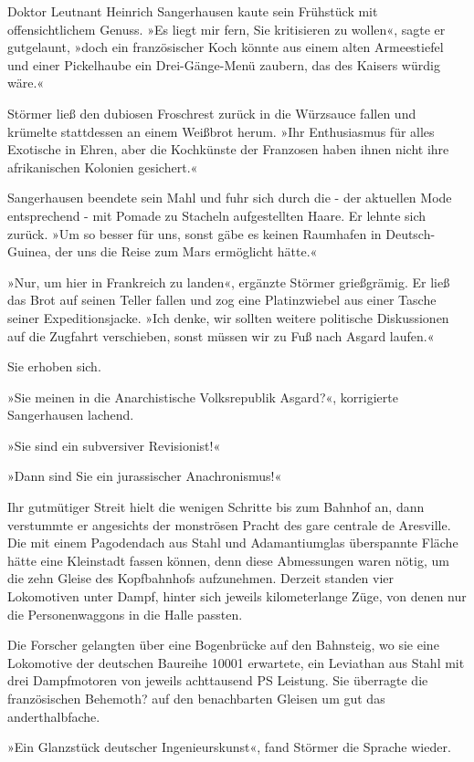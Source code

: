 Doktor Leutnant Heinrich Sangerhausen kaute sein Frühstück mit
offensichtlichem Genuss. »Es liegt mir fern, Sie kritisieren zu
wollen«, sagte er gutgelaunt, »doch ein französischer Koch könnte
aus einem alten Armeestiefel und einer Pickelhaube ein
Drei-Gänge-Menü zaubern, das des Kaisers würdig wäre.«

Störmer ließ den dubiosen Froschrest zurück in die Würzsauce fallen
und krümelte stattdessen an einem Weißbrot herum. »Ihr Enthusiasmus
für alles Exotische in Ehren, aber die Kochkünste der Franzosen
haben ihnen nicht ihre afrikanischen Kolonien gesichert.«

Sangerhausen beendete sein Mahl und fuhr sich durch die - der
aktuellen Mode entsprechend - mit Pomade zu Stacheln aufgestellten
Haare. Er lehnte sich zurück. »Um so besser für uns, sonst gäbe es
keinen Raumhafen in Deutsch-Guinea, der uns die Reise zum Mars
ermöglicht hätte.«

»Nur, um hier in Frankreich zu landen«, ergänzte Störmer
grießgrämig. Er ließ das Brot auf seinen Teller fallen und zog eine
Platinzwiebel aus einer Tasche seiner Expeditionsjacke. »Ich denke,
wir sollten weitere politische Diskussionen auf die Zugfahrt
verschieben, sonst müssen wir zu Fuß nach Asgard laufen.«

Sie erhoben sich.

»Sie meinen in die Anarchistische Volksrepublik Asgard?«,
korrigierte Sangerhausen lachend.

»Sie sind ein subversiver Revisionist!«

»Dann sind Sie ein jurassischer Anachronismus!«

Ihr gutmütiger Streit hielt die wenigen Schritte bis zum Bahnhof
an, dann verstummte er angesichts der monströsen Pracht des gare
centrale de Aresville. Die mit einem Pagodendach aus Stahl und
Adamantiumglas überspannte Fläche hätte eine Kleinstadt fassen
können, denn diese Abmessungen waren nötig, um die zehn Gleise des
Kopfbahnhofs aufzunehmen. Derzeit standen vier Lokomotiven unter
Dampf, hinter sich jeweils kilometerlange Züge, von denen nur die
Personenwaggons in die Halle passten.

Die Forscher gelangten über eine Bogenbrücke auf den Bahnsteig, wo
sie eine Lokomotive der deutschen Baureihe 10001 erwartete, ein
Leviathan aus Stahl mit drei Dampfmotoren von jeweils achttausend
PS Leistung. Sie überragte die französischen Behemoth? auf den
benachbarten Gleisen um gut das anderthalbfache.

»Ein Glanzstück deutscher Ingenieurskunst«, fand Störmer die
Sprache wieder.


